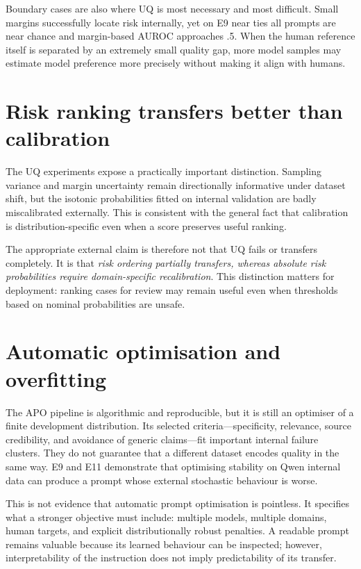 \documentclass[11pt,twoside,a4paper]{report}
\begin{document}
Boundary cases are also where UQ is most necessary and most difficult.  Small margins
successfully locate risk internally, yet on E9 near ties all prompts are near chance
and margin-based AUROC approaches .5.  When the human reference itself is separated
by an extremely small quality gap, more model samples may estimate model preference
more precisely without making it align with humans.

\section{Risk ranking transfers better than calibration}

The UQ experiments expose a practically important distinction.  Sampling variance
and margin uncertainty remain directionally informative under dataset shift, but the
isotonic probabilities fitted on internal validation are badly miscalibrated
externally.  This is consistent with the general fact that calibration is
distribution-specific even when a score preserves useful ranking.

The appropriate external claim is therefore not that UQ fails or transfers
completely.  It is that \emph{risk ordering partially transfers, whereas absolute
risk probabilities require domain-specific recalibration}.  This distinction matters
for deployment: ranking cases for review may remain useful even when thresholds
based on nominal probabilities are unsafe.

\section{Automatic optimisation and overfitting}

The APO pipeline is algorithmic and reproducible, but it is still an optimiser of a
finite development distribution.  Its selected criteria---specificity, relevance,
source credibility, and avoidance of generic claims---fit important internal failure
clusters.  They do not guarantee that a different dataset encodes quality in the same
way.  E9 and E11 demonstrate that optimising stability on Qwen internal data can
produce a prompt whose external stochastic behaviour is worse.

This is not evidence that automatic prompt optimisation is pointless.  It specifies
what a stronger objective must include: multiple models, multiple domains, human
targets, and explicit distributionally robust penalties.  A readable prompt remains
valuable because its learned behaviour can be inspected; however, interpretability
of the instruction does not imply predictability of its transfer.
\end{document}
